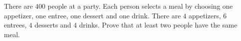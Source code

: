 There are $400$ people at a party. Each person selects a meal by choosing one appetizer, one entree, one dessert and one drink. There are $4$ appetizers, $6$ entrees, $4$ desserts and $4$ drinks. Prove that at least two people have the same meal.
